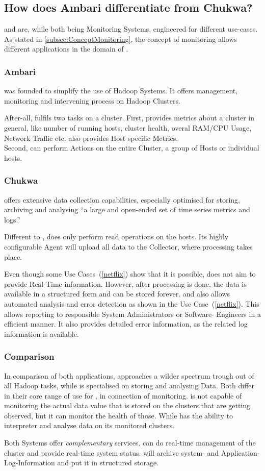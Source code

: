 \subsection{How does Ambari differentiate from Chukwa?}
\label{subsec:Differentiation}

\amb and \chuk are, while both being Monitoring Systems, engineered for different use-cases. 
As stated in \ref{subsec:ConceptMonitoring}, the concept of monitoring allows different applications in the domain of \isds. 

\subsubsection{Ambari}
\amb was founded to simplify the use of Hadoop Systems. It offers management, monitoring and intervening process on Hadoop Clusters.\cite{Hortonworks2013} 

After-all, \amb fulfils two tasks on a \hadoop cluster. 
First, \amb provides metrics about a cluster in general, like number of running hosts, cluster health, overal RAM/CPU Usage, Network Traffic etc. \amb also provides Host specific Metrics.
\\
Second, \amb can perform Actions on the entire Cluster, a group of Hosts or individual hosts. 

\subsubsection{Chukwa}
\chuk offers extensive data collection capabilities, especially optimised for storing, archiving and analysing ``a large and open-ended set of time series metrics and logs.''~\cite{Boulona}

Different to \amb, \chuk does only perform read operations on the hosts. Its highly configurable Agent will upload all data to the Collector, where processing takes place.


Even though some Use Cases~(\ref{netflix}) show that it is possible, \chuk does not aim to provide Real-Time information. However, after processing is done, the data is available in a structured form and can be stored forever. \mr and \demux also allows automated analysis and error detection as shown in the Use Case~(\ref{netflix}). This allows reporting to responsible System Administrators or Software- Engineers in a efficient manner. It also provides detailed error information, as the related log information is available.

\subsubsection{Comparison}
In comparison of both applications, \amb approaches a wilder spectrum trough out of all Hadoop tasks, while \chuk is specialised on storing and analysing \hadoop Data. Both differ in their core range of use for \hadoop, in connection of monitoring. \amb is not capable of monitoring the actual data value that is stored on the clusters that are getting observed, but it can monitor the health of those.\cite{ApacheSoftwareFoundation2015} While \chuk has the ability to interpreter and analyse data on its monitored clusters.

Both Systems offer \emph{complementary} services. \amb can do real-time management of the cluster and provide real-time system status. \chuk will archive system- and Application-Log-Information and put it in structured \hdfs storage.